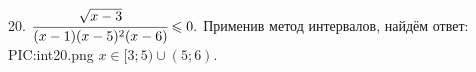 20. $\cfrac{\sqrt{x-3}}{(x-1)(x-5)^2(x-6)}\leqslant0.$
Применив метод интервалов, найдём ответ:
{{PIC:int20.png}}
$x\in[3;5)\cup(5;6).$\\

